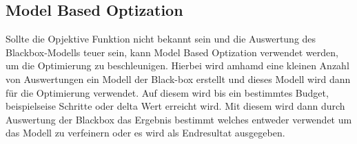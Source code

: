 \subsection{Model Based Optization}
\label{sec:Model Based Optization}
Sollte die Opjektive Funktion nicht bekannt sein und die Auswertung des
Blackbox-Modells teuer sein, kann Model Based Optization verwendet werden, um
die Optimierung zu beschleunigen. Hierbei wird amhamd eine kleinen Anzahl von 
Auswertungen ein Modell der Black-box erstellt und dieses Modell wird 
dann für die Optimierung verwendet. Auf diesem wird bis ein bestimmtes Budget,
beispielseise Schritte oder delta Wert erreicht wird. Mit diesem wird dann durch
Auswertung der Blackbox das Ergebnis bestimmt welches entweder verwendet um das
Modell zu verfeinern oder es wird als Endresultat ausgegeben.
\cite[4]{bisch18pr}


